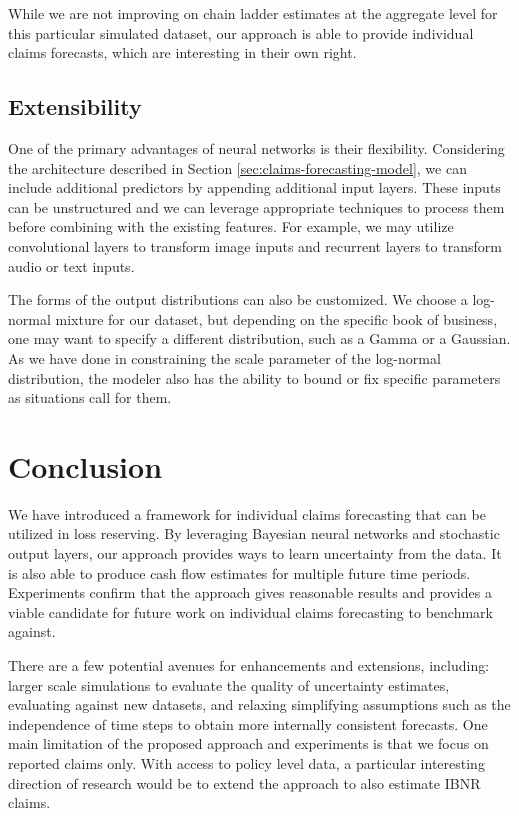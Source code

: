 \documentclass{article}
\begin{document}
While we are not improving on chain ladder estimates at the aggregate level for this particular simulated dataset, our approach is able to provide individual claims forecasts, which are interesting in their own right.

\subsection{Extensibility}

One of the primary advantages of neural networks is their flexibility. Considering the architecture described in Section \ref{sec:claims-forecasting-model}, we can include additional predictors by appending additional input layers. These inputs can be unstructured and we can leverage appropriate techniques to process them before combining with the existing features. For example, we may utilize convolutional layers to transform image inputs and recurrent layers to transform audio or text inputs.

The forms of the output distributions can also be customized. We choose a log-normal mixture for our dataset, but depending on the specific book of business, one may want to specify a different distribution, such as a Gamma or a Gaussian. As we have done in constraining the scale parameter of the log-normal distribution, the modeler also has the ability to bound or fix specific parameters as situations call for them.

\section{Conclusion}

We have introduced a framework for individual claims forecasting that can be utilized in loss reserving. By leveraging Bayesian neural networks and stochastic output layers, our approach provides ways to learn uncertainty from the data. It is also able to produce cash flow estimates for multiple future time periods. Experiments confirm that the approach gives reasonable results and provides a viable candidate for future work on individual claims forecasting to benchmark against.

There are a few potential avenues for enhancements and extensions, including: larger scale simulations to evaluate the quality of uncertainty estimates, evaluating against new datasets, and relaxing simplifying assumptions such as the independence of time steps to obtain more internally consistent forecasts. One main limitation of the proposed approach and experiments is that we focus on reported claims only. With access to policy level data, a particular interesting direction of research would be to extend the approach to also estimate IBNR claims.
\end{document}
